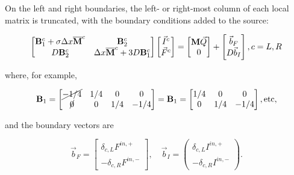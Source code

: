 \documentclass{template}
\begin{document}
On the left and right boundaries, the left- or right-most column of each local matrix is truncated, with the boundary conditions added to the source:

\begin{equation}
    \begin{bmatrix}
        \mathbf{{B}}^c_1 + \sigma \Delta x \overline{\mathbf{{M}}}^c & \mathbf{{B}}_2^c\\
        D \mathbf{{B}}_2^c & \Delta x \overline{\mathbf{{M}}}^c + 3 D \mathbf{{B}}_1^c
    \end{bmatrix}
    \begin{bmatrix}
        \vec{I}^c\\
        \vec{F}^c
    \end{bmatrix} = 
    \begin{bmatrix}
        \mathbf{{M}}\vec{Q} \\
        0
    \end{bmatrix} + 
    \begin{bmatrix}
        \vec{b}_F \\
        D \vec{b}_I
    \end{bmatrix}, c= L, R
\end{equation}

where, for example,

\begin{equation}
    \mathbf{{B}}_1 = \begin{bmatrix}
        \cancel{-1/4} & 1/4 & 0 & 0\\
        \cancel{0} & 0 & 1/4 & -1/4
    \end{bmatrix} = \mathbf{{B}}_1 = \begin{bmatrix}
        1/4 & 0 & 0\\
        0 & 1/4 & -1/4
    \end{bmatrix}, \text{etc},
\end{equation}

and the boundary vectors are

\begin{equation}
    \vec{b}_F = \begin{bmatrix}
        \delta_{c, L}F^{in, +}\\
        -\delta_{c, R}F^{in, -}
    \end{bmatrix},\quad \vec{b}_I = \begin{pmatrix}
        \delta_{c, L}I^{in, +}\\
        -\delta_{c, R}I^{in, -}
    \end{pmatrix}.
\end{equation}
\end{document}

